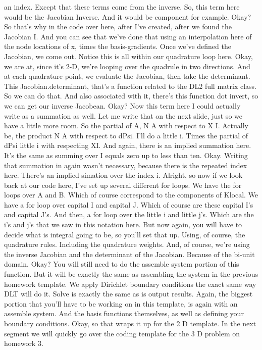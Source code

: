 \documentclass[10pt]{article}
\begin{document}
an index. Except that these terms come from the inverse. So, this term here would be the Jacobian Inverse. And it would be component  for example. Okay? So that's why in the code over here, after I've created, after we found the Jacobian I. And you can see that we've done that using an interpolation here of the node locations of x, times the basis-gradients. Once we've defined the Jacobian, we come out. Notice this is all within our quadrature loop here. Okay, we are at, since it's 2-D, we're looping over the quadrule in two directions. And at each quadrature point, we evaluate the Jacobian, then take the determinant. This Jacobian.determinant, that's a function related to the DL2 full matrix class. So we can do that. And also associated with it, there's this function dot invert, so we can get our inverse Jacobean. Okay? Now this term here I could actually write as a summation as well. Let me write that on the next slide, just so we have a little more room. So the partial of A, N A with respect to X I. Actually be, the product N A with respect to dPsi. I'll do a little i. Times the partial of dPsi little i with respecting XI. And again, there is an implied summation here. It's the same as summing over I equals zero up to less than ten. Okay. Writing that summation in again wasn't necessary, because there is the repeated index here. There's an implied simation over the index i. Alright, so now if we look back at our code here, I've set up several different for loops. We have the for loops over A and B. Which of course correspond to the components of Klocal. We have a for loop over capital I and capital J. Which of course are these capital I's and capital J's. And then, a for loop over the little i and little j's. Which are the i's and j's that we saw in this notation here. But now again, you will have to decide what is integral going to be, so you'll set that up. Using, of course, the quadrature rules. Including the quadrature weights. And, of course, we're using the inverse Jacobian and the determinant of the Jacobian. Because of the bi-unit domain. Okay? You will still need to do the assemble system portion of this function. But it will be exactly the same as assembling the system in the previous homework template. We apply Dirichlet boundary conditions the exact same way DLT will do it. Solve is exactly the same as is output results. Again, the biggest portion that you'll have to be working on in this template, is again with an assemble system. And the basis functions themselves, as well as defining your boundary conditions. Okay, so that wraps it up for the 2 D template. In the next segment we will quickly go over the coding template for the 3 D problem on homework 3.
\end{document}
